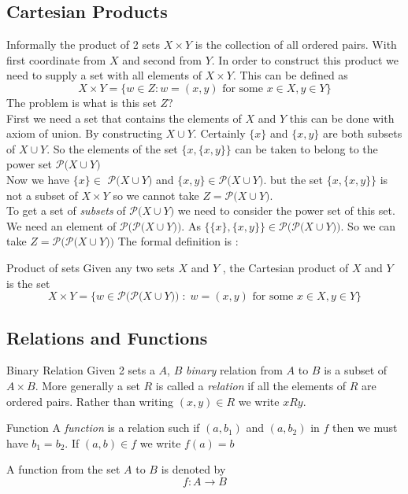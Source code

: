 \documentclass[16pt,a4paper]{article}
\theoremstyle{definition}
\begin{document}
\newpage
\subsection{Cartesian Products}
Informally the product of 2 sets $X\times Y$ is the collection of all ordered pairs. With first coordinate from $X$ and second from $Y$. In order to construct this product we need to supply a set with all elements of $X\times Y$. This can be defined as
\[X\times Y = \{w\in Z : w = (x,y) \text{ for some } x\in X, y\in Y\}\]   
The problem is what is this set $Z$?\\
First we need a set that contains the elements of $X$ and $Y$ this can be done with axiom of union. By constructing $X\cup Y$. Certainly $\{x\}$ and $\{x,y\}$ are both subsets of $X\cup Y$. So the elements of the set $\{x, \{x,y\}\}$ can be taken to belong to the power set $\mathcal{P(}X\cup Y)$\\
Now we have $\{x\} \in $ $\mathcal{P(}X\cup Y)$ and $\{x,y\} \in\mathcal{P(}X\cup Y)$. but the set $\{x, \{x,y\}\}$ is not a subset of $X\times Y$ so we cannot take $ Z = \mathcal{P(}X\cup Y)$. \\
To get a set of \textit{subsets} of $\mathcal{P(}X\cup Y)$ we need to consider the power set of this set. We need an element of $\mathcal{P(}\mathcal{P(}X\cup Y))$. As $\{\{x\}, \{x,y\}\} \in \mathcal{P(}\mathcal{P(}X\cup Y))$. So we can take $Z = \mathcal{P(}\mathcal{P(}X\cup Y))$ The formal definition is :
\begin{defn}{Product of sets}{}
Given any two sets $X$ and $Y$ , the Cartesian product of $X$ and $Y$ is the set
\[X\times Y = \{w\in \mathcal{P(}\mathcal{P(}X\cup Y)) \;:\; w = (x,y) \text{ for some } x\in X, y\in Y\}\]
\end{defn}

\subsection{Relations and Functions}
\begin{defn}{Binary Relation}{}
Given 2 sets a $A$, $B$ \textit{binary} relation from $A$ to $B$ is a subset of $A\times B$. More generally a set $R$ is called a \textit{relation} if all the elements of $R$ are ordered pairs. Rather than writing $(x,y) \in R$ we write $xRy$.
\end{defn}
\begin{defn}{Function}{}
A \textit{function} is a relation such if $(a,b_1)$ and $(a, b_2)$ in $f$ then we must have $b_1 = b_2$. If $(a,b)\in f$ we write $f(a) = b$ 
\end{defn}
A function from the set $A$ to $B$ is denoted by 
\[f:A \rightarrow B\]
\newpage
\end{document}
